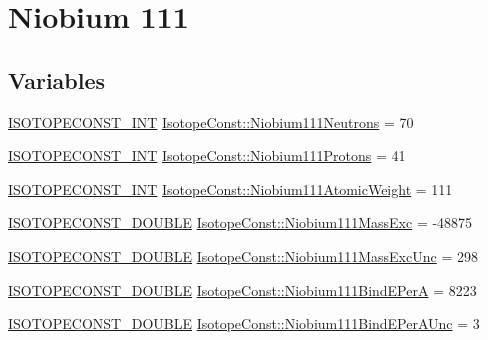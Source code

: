 \hypertarget{group___isotope_const-_niobium-_nb111}{}\section{Niobium 111}
\label{group___isotope_const-_niobium-_nb111}
\subsection*{Variables}
\begin{DoxyCompactItemize}
\item 
\mbox{\hyperlink{group___isotope_const-_macros_ga5f18360b3e99483a35c32d789e62621c}{I\+S\+O\+T\+O\+P\+E\+C\+O\+N\+S\+T\+\_\+\+I\+NT}} \mbox{\hyperlink{group___isotope_const-_niobium-_nb111_ga7fa8a1a8e81c6b79d46503c0c78e1685}{Isotope\+Const\+::\+Niobium111\+Neutrons}} = 70
\item 
\mbox{\hyperlink{group___isotope_const-_macros_ga5f18360b3e99483a35c32d789e62621c}{I\+S\+O\+T\+O\+P\+E\+C\+O\+N\+S\+T\+\_\+\+I\+NT}} \mbox{\hyperlink{group___isotope_const-_niobium-_nb111_ga5545ea2108969311e248d6be2d82ea9f}{Isotope\+Const\+::\+Niobium111\+Protons}} = 41
\item 
\mbox{\hyperlink{group___isotope_const-_macros_ga5f18360b3e99483a35c32d789e62621c}{I\+S\+O\+T\+O\+P\+E\+C\+O\+N\+S\+T\+\_\+\+I\+NT}} \mbox{\hyperlink{group___isotope_const-_niobium-_nb111_ga7bf3c74648b84662164867b5eb6b4eb9}{Isotope\+Const\+::\+Niobium111\+Atomic\+Weight}} = 111
\item 
\mbox{\hyperlink{group___isotope_const-_macros_ga8f45a7272ce02c0b4c65c44636ed719a}{I\+S\+O\+T\+O\+P\+E\+C\+O\+N\+S\+T\+\_\+\+D\+O\+U\+B\+LE}} \mbox{\hyperlink{group___isotope_const-_niobium-_nb111_gada42d1836c7c206400d313452150ffae}{Isotope\+Const\+::\+Niobium111\+Mass\+Exc}} = -\/48875
\item 
\mbox{\hyperlink{group___isotope_const-_macros_ga8f45a7272ce02c0b4c65c44636ed719a}{I\+S\+O\+T\+O\+P\+E\+C\+O\+N\+S\+T\+\_\+\+D\+O\+U\+B\+LE}} \mbox{\hyperlink{group___isotope_const-_niobium-_nb111_ga79735177c79e39007d8502cd3cebdc13}{Isotope\+Const\+::\+Niobium111\+Mass\+Exc\+Unc}} = 298
\item 
\mbox{\hyperlink{group___isotope_const-_macros_ga8f45a7272ce02c0b4c65c44636ed719a}{I\+S\+O\+T\+O\+P\+E\+C\+O\+N\+S\+T\+\_\+\+D\+O\+U\+B\+LE}} \mbox{\hyperlink{group___isotope_const-_niobium-_nb111_ga139e789a89ebf09b8484641a0c19dfa2}{Isotope\+Const\+::\+Niobium111\+Bind\+E\+PerA}} = 8223
\item 
\mbox{\hyperlink{group___isotope_const-_macros_ga8f45a7272ce02c0b4c65c44636ed719a}{I\+S\+O\+T\+O\+P\+E\+C\+O\+N\+S\+T\+\_\+\+D\+O\+U\+B\+LE}} \mbox{\hyperlink{group___isotope_const-_niobium-_nb111_ga868ec834508a702d867e689965cab4d1}{Isotope\+Const\+::\+Niobium111\+Bind\+E\+Per\+A\+Unc}} = 3

\end{DoxyCompactItemize}
